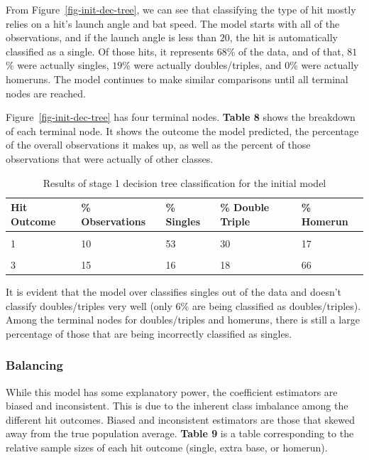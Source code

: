 \documentclass[
  letterpaper,
  DIV=11,
  numbers=noendperiod]{scrartcl}
\begin{document}
From Figure~\ref{fig-init-dec-tree}, we can see that classifying the
type of hit mostly relies on a hit's launch angle and bat speed. The
model starts with all of the observations, and if the launch angle is
less than \(20\), the hit is automatically classified as a single. Of
those hits, it represents \(68\)\% of the data, and of that, \(81\)\%
were actually singles, \(19\)\% were actually doubles/triples, and
\(0\)\% were actually homeruns. The model continues to make similar
comparisons until all terminal nodes are reached.

Figure~\ref{fig-init-dec-tree} has four terminal nodes. \textbf{Table 8}
shows the breakdown of each terminal node. It shows the outcome the
model predicted, the percentage of the overall observations it makes up,
as well as the percent of those observations that were actually of other
classes.

\begin{table}[!h]
\centering
\caption{\label{tab:unnamed-chunk-38}Results of stage 1 decision tree classification for the initial model}
\centering
\begin{tabular}[t]{lllll}
\toprule
Hit Outcome & \% Observations & \% Singles & \% Double Triple & \% Homerun\\
\midrule
\cellcolor{gray!10}{1} & \cellcolor{gray!10}{68} & \cellcolor{gray!10}{81} & \cellcolor{gray!10}{19} & \cellcolor{gray!10}{0}\\
1 & 10 & 53 & 30 & 17\\
\cellcolor{gray!10}{2} & \cellcolor{gray!10}{6} & \cellcolor{gray!10}{28} & \cellcolor{gray!10}{44} & \cellcolor{gray!10}{28}\\
3 & 15 & 16 & 18 & 66\\
\bottomrule
\end{tabular}
\end{table}

It is evident that the model over classifies singles out of the data and
doesn't classify doubles/triples very well (only \(6\)\% are being
classified as doubles/triples). Among the terminal nodes for
doubles/triples and homeruns, there is still a large percentage of those
that are being incorrectly classified as singles.

\subsubsection{Balancing}\label{balancing}

While this model has some explanatory power, the coefficient estimators
are biased and inconsistent. This is due to the inherent class imbalance
among the different hit outcomes. Biased and inconsistent estimators are
those that skewed away from the true population average. \textbf{Table
9} is a table corresponding to the relative sample sizes of each hit
outcome (single, extra base, or homerun).
\end{document}
